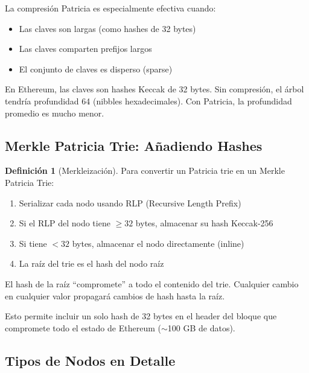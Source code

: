 \documentclass[11pt,a4paper,twoside,openright]{book}
\theoremstyle{definition}
\newtheorem{definition}{Definición}[chapter]
\theoremstyle{plain}
\theoremstyle{remark}
\begin{document}
\begin{keyidea}
La compresión Patricia es especialmente efectiva cuando:
\begin{itemize}
    \item Las claves son largas (como hashes de 32 bytes)
    \item Las claves comparten prefijos largos
    \item El conjunto de claves es disperso (sparse)
\end{itemize}

En Ethereum, las claves son hashes Keccak de 32 bytes. Sin compresión, el árbol tendría profundidad 64 (nibbles hexadecimales). Con Patricia, la profundidad promedio es mucho menor.
\end{keyidea}

\subsection{Merkle Patricia Trie: Añadiendo Hashes}

\begin{definition}[Merkleización]
Para convertir un Patricia trie en un Merkle Patricia Trie:
\begin{enumerate}
    \item Serializar cada nodo usando RLP (Recursive Length Prefix)
    \item Si el RLP del nodo tiene $\geq 32$ bytes, almacenar su hash Keccak-256
    \item Si tiene $< 32$ bytes, almacenar el nodo directamente (inline)
    \item La raíz del trie es el hash del nodo raíz
\end{enumerate}
\end{definition}

\begin{intuicion}
El hash de la raíz ``compromete'' a todo el contenido del trie. Cualquier cambio en cualquier valor propagará cambios de hash hasta la raíz.

Esto permite incluir un solo hash de 32 bytes en el header del bloque que compromete todo el estado de Ethereum ($\sim$100 GB de datos).
\end{intuicion}

\subsection{Tipos de Nodos en Detalle}
\end{document}
